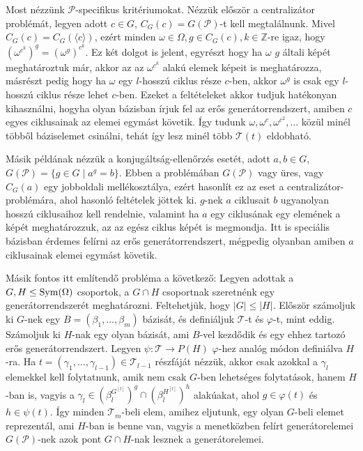 Most nézzünk $\mathcal{P}$-specifikus kritériumokat.
Nézzük először a centralizátor problémát, legyen adott $c \in G$, $C_G(c) = G(\mathcal{P})$-t kell megtalálnunk.
Mivel $C_G(c) = C_G(\langle c \rangle)$, ezért minden $\omega \in \Omega, g \in C_G(c), k \in \mathbb{Z}$-re igaz, hogy $(\omega^{c^k})^g = (\omega^g)^{c^k}$.
Ez két dolgot is jelent, egyrészt hogy ha $\omega$ $g$ általi képét meghatároztuk már, akkor az az $\omega^{c^k}$ alakú elemek képeit is meghatározza,
másrészt pedig hogy ha $\omega$ egy $l$-hosszú ciklus része $c$-ben, akkor $\omega^g$ is csak egy $l$-hosszú ciklus része lehet $c$-ben.
Ezeket a feltételeket akkor tudjuk hatékonyan kihasználni, hogyha olyan bázisban írjuk fel az erős generátorrendszert, amiben $c$ egyes ciklusainak az elemei egymást követik.
Így tudunk $\omega, \omega^c, \omega^{c^2}, \dots$ közül minél többől báziselemet csinálni, tehát így lesz minél több $\mathcal{T}(t)$ eldobható.

Másik példának nézzük a konjugáltság-ellenőrzés esetét, adott $a, b \in G$, $G(\mathcal{P}) = \{g \in G \mid a^g = b \}$.
Ebben a problémában $G(\mathcal{P})$ vagy üres, vagy $C_G(a)$ egy jobboldali mellékosztálya, ezért hasonlít ez az eset a centralizátor-problémára, ahol hasonló feltételek jöttek ki.
$g$-nek $a$ ciklusait $b$ ugyanolyan hosszú ciklusaihoz kell rendelnie, valamint ha $a$ egy ciklusának egy elemének a képét meghatározzuk, az az egész ciklus képét is megmondja.
Itt is speciális bázisban érdemes felírni az erős generátorrendszert, mégpedig olyanban amiben $a$ ciklusainak elemei egymást követik.

Másik fontos itt említendő probléma a következő:
Legyen adottak a $G, H \le \operatorname{Sym}(\Omega)$ csoportok, a $G\cap H$ csoportnak szeretnénk egy generátorrendszerét meghatározni.
Feltehetjük, hogy $|G| \le |H|$.
Először számoljuk ki $G$-nek egy $B = (\beta_1, \dots, \beta_m)$ bázisát, és definiáljuk $\mathcal{T}$-t és $\varphi$-t, mint eddig.
Számoljuk ki $H$-nak egy olyan bázisát, ami $B$-vel kezdődik és egy ehhez tartozó erős generátorrendszert.
Legyen $\psi : \mathcal{T} \to P(H)$ $\varphi$-hez analóg módon definiálva $H$-ra.
Ha $t = (\gamma_1, \dots, \gamma_{l-1}) \in \mathcal{T}_{l-1}$ részfáját nézzük, akkor csak azokkal a $\gamma_l$ elemekkel kell folytatnunk,
amik nem csak $G$-ben lehetséges folytatások, hanem $H$-ban is, vagyis a $\gamma_l \in (\beta_l^{G^{[l]}})^g \cap (\beta_l^{H^{[l]}})^h$ alakúakat,
ahol $g \in \varphi(t)$ és $h \in \psi(t)$.
Így minden $\mathcal{T}_m$-beli elem, amihez eljutunk, egy olyan $G$-beli elemet reprezentál, ami $H$-ban is benne van,
vagyis a menetközben felírt generátorelemei $G(\mathcal{P})$-nek azok pont $G\cap H$-nak lesznek a generátorelemei.
